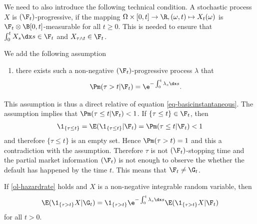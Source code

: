 We need to also introduce the following technical condition. A stochastic process $X$ is $(\F_t)$-progressive, if the mapping $\Omega \times [0,t]\rightarrow \R, (\omega, t) \mapsto X_t(\omega)$ is $\F_t \otimes \B [0,t ]$-measurable for all $t \geq 0$. This is needed to ensure that $\int_0^t X_s \dx s \in \F_t$ and $X_{\tau \wedge t} \in \F_t$.

We add the following assumption
  \begin{enumerate}[labelindent=\parindent, leftmargin=*, label*=(\Alph*), resume]
    \item there exists such a non-negative $(\F_t)$-progressive process $\lambda$ that \label{ol-hazardrate}
      \begin{align}
        \Pm ( \tau > t | \F_t ) = \e^{-\int_0^t \lambda_s \dx s} .
      \end{align}
  \end{enumerate}
This assumption is thus a direct relative of equation \ref{eq-basicinstantaneous}. The assumption implies that $\Pm ( \tau \leq t | \F_t ) < 1$. If $\{ \tau \leq t \} \in \F_t$, then 
  \begin{align}
    \1_{ \{ \tau \leq t \} } = \E ( \1_{ \{ \tau \leq t \} } | \F_t ) = \Pm ( \tau \leq t | \F_t ) < 1
  \end{align}
and therefore $\{ \tau \leq t \}$ is an empty set. Hence $\Pm ( \tau > t ) = 1$ and this a contradiction with the assumption. Therefore $\tau$ is not $(\F_t)$-stopping time and the partial market information $(\F_t)$ is not enough to observe the whether the default has happened by the time $t$. This means that $\F_t \not = \G_t$.

\begin{lemma}
\label{lemma-firstconditionalexpectionintensity}
If \ref{ol-hazardrate} holds and $X$ is a non-negative integrable random variable, then
  \begin{align}
    \E (\1_{ \{ \tau > t \} } X | \G_t ) = \1_{ \{ \tau > t \} } \e^{-\int_0^t \lambda_s \dx s} \E ( \1_{ \{ \tau > t \} } X | \F_t )
  \end{align}
for all $t > 0$.
\end{lemma}

